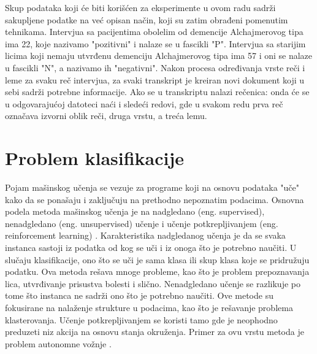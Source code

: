 \documentclass[12pt,oneside]{memoir}
\begin{document}
Skup podataka koji će biti korišćen za eksperimente u ovom radu sadrži sakupljene podatke na već opisan način, koji su zatim obrađeni pomenutim tehnikama. Intervjua sa pacijentima obolelim od demencije Alchajmerovog tipa ima 22, koje nazivamo "pozitivni" i nalaze se u fascikli "P". Intervjua sa starijim licima koji nemaju utvrđenu demenciju Alchajmerovog tipa ima 57 i oni se nalaze u fascikli "N", a nazivamo ih "negativni". Nakon procesa određivanja vrste reči i leme za svaku reč intervjua, za svaki transkript je kreiran novi dokument koji u sebi sadrži potrebne informacije. 
\newpage
\noindent
Ako se u transkriptu nalazi rečenica:
\newline
\newline
\noindent{}
\newline
\newline
onda će se u odgovarajućoj datoteci naći i sledeći redovi, gde u svakom redu prva reč označava izvorni oblik reči, druga vrstu, a treća lemu.
\newline
\newline
\noindent{}
\newline
\newline

\chapter{Problem klasifikacije}

Pojam mašinskog učenja se vezuje za programe koji na osnovu podataka "uče" kako da se ponašaju i zaključuju na prethodno nepoznatim podacima. Osnovna podela metoda mašinskog učenja je na nadgledano (eng. supervised), nenadgledano (eng. unsupervised) učenje i učenje potkrepljivanjem (eng. reinforcement learning) \cite{MladenAndjelka}. Karakteristika nadgledanog učenja je da se svaka instanca sastoji iz podatka od kog se uči i iz onoga što je potrebno naučiti. U slučaju klasifikacije, ono što se uči je sama klasa ili skup klasa koje se pridružuju podatku. Ova metoda rešava mnoge probleme, kao što je problem prepoznavanja lica, utvrđivanje prisustva bolesti i slično. Nenadgledano učenje se razlikuje po tome što instanca ne sadrži ono što je potrebno naučiti. Ove metode su fokusirane na nalaženje strukture u podacima, kao što je rešavanje problema klasterovanja. Učenje potkrepljivanjem se koristi tamo gde je neophodno preduzeti niz akcija na osnovu stanja okruženja. Primer za ovu vrstu metoda je problem autonomne vožnje \cite{MladenAndjelka}.
\end{document}
